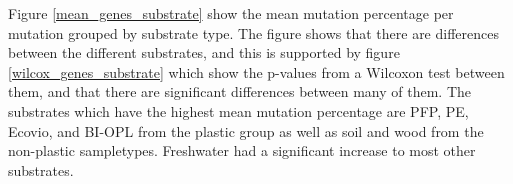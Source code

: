 Figure \ref{mean_genes_substrate} show the mean mutation percentage per mutation grouped by substrate type. The figure shows that there are differences between the different substrates, and this is supported by figure \ref{wilcox_genes_substrate} which show the p-values from a Wilcoxon test between them, and that there are significant differences between many of them.
The substrates which have the highest mean mutation percentage are PFP, PE, Ecovio, and BI-OPL from the plastic group as well as soil and wood from the non-plastic sampletypes. Freshwater had a significant increase to most other substrates.


